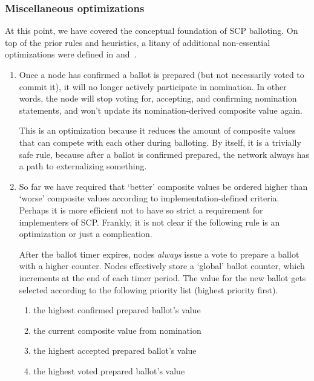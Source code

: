 \subsubsection{Miscellaneous optimizations}

At this point, we have covered the conceptual foundation of SCP balloting. On top of the prior rules and heuristics, a litany of additional non-essential optimizations were defined in \cite{stellar-consensus-protocol} and~\cite{scp-ietf-draft}.

\begin{enumerate}
    \item Once a node has confirmed a ballot is prepared (but not necessarily voted to commit it), it will no longer actively participate in nomination. In other words, the node will stop voting for, accepting, and confirming nomination statements, and won't update its nomination-derived composite value again.

    This is an optimization because it reduces the amount of composite values that can compete with each other during balloting. By itself, it is a trivially safe rule, because after a ballot is confirmed prepared, the network always has a path to externalizing something.

    \item So far we have required that `better' composite values be ordered higher than `worse' composite values according to implementation-defined criteria. Perhaps it is more efficient not to have so strict a requirement for implementers of SCP. Frankly, it is not clear if the following rule is an optimization or just a complication.

    After the ballot timer expires, nodes {\em always} issue a vote to prepare a ballot with a higher counter. Nodes effectively store a `global' ballot counter, which increments at the end of each timer period. The value for the new ballot gets selected according to the following priority list (highest priority first).
    \begin{enumerate}
        \item the highest confirmed prepared ballot's value
        \item the current composite value from nomination
        \item the highest accepted prepared ballot's value
        \item the highest voted prepared ballot's value
    \end{enumerate}


\end{enumerate}
